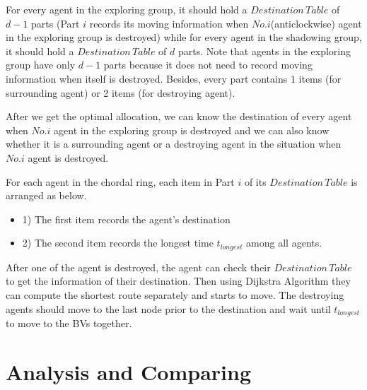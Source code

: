 For every agent in the exploring group, it should hold a $Destination\,Table$ of $d-1$ parts (Part $i$ records its moving information when $No.i$(anticlockwise) agent in the exploring group is destroyed) while for every agent in the shadowing group, it should hold a $Destination\,Table$ of $d$ parts. Note that agents in the exploring group have only $d-1$ parts because it does not need to record moving information when itself is destroyed. Besides, every part contains 1 items (for surrounding agent) or 2 items (for destroying agent). 

After we get the optimal allocation, we can know the destination of every agent when $No.i$ agent in the exploring group is destroyed and we can also know whether it is a surrounding agent or a destroying agent in the situation when $No.i$ agent is destroyed.

For each agent in the chordal ring, each item in Part $i$ of its $Destination\,Table$ is arranged as below. 
\begin{itemize}
\item 1) The first item records the agent's destination
\item 2) The second item records the longest time $t_{longest}$ among all agents.
\end{itemize}


After one of the agent is destroyed, the agent can check their $Destination\,Table$ to get the information of their destination. Then using Dijkstra Algorithm they can compute the shortest route separately and starts to move. The destroying agents should move to the last node prior to the destination and wait until $t_{longest}$ to move to the BVs together. 


\section{Analysis and Comparing}

